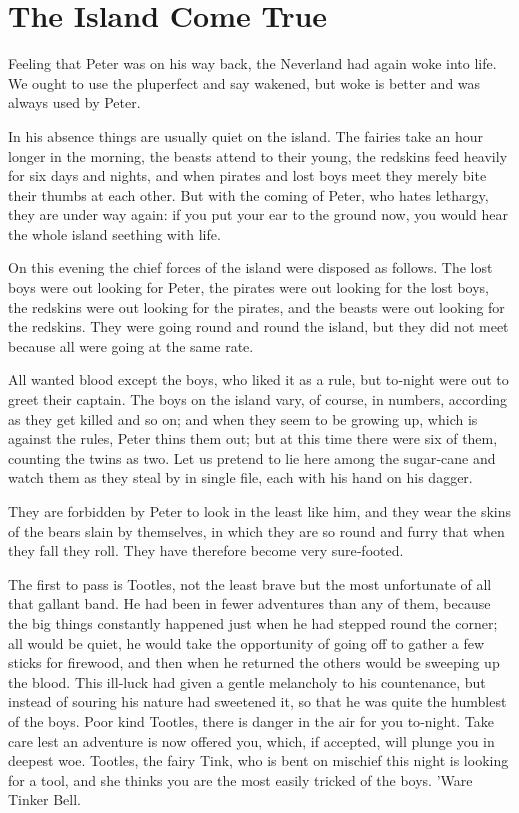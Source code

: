 
\chapter{The Island Come True}

Feeling that Peter was on his way back,
the Neverland had again woke into life.
We ought to use the pluperfect and say wakened,
but woke is better and was always used by Peter.

In his absence things are usually quiet on the island.
The fairies take an hour longer in the morning,
the beasts attend to their young,
the redskins feed heavily for six days and nights,
and when pirates and lost boys meet they merely bite their thumbs at each other.
But with the coming of Peter, who hates lethargy, they are under way again:
if you put your ear to the ground now, you would hear the whole island seething with life.

On this evening the chief forces of the island were disposed as follows.
The lost boys were out looking for Peter,
the pirates were out looking for the lost boys,
the redskins were out looking for the pirates,
and the beasts were out looking for the redskins.
They were going round and round the island,
but they did not meet because all were going at the same rate.

All wanted blood except the boys,
who liked it as a rule, but to‐night were out to greet their captain.
The boys on the island vary, of course, in numbers, according as they get killed and so on;
and when they seem to be growing up, which is against the rules, Peter thins them out;
but at this time there were six of them, counting the twins as two.
Let us pretend to lie here among the sugar‐cane and watch them as they steal by in single file,
each with his hand on his dagger.

They are forbidden by Peter to look in the least like him,
and they wear the skins of the bears slain by themselves,
in which they are so round and furry that when they fall they roll.
They have therefore become very sure‐footed.

The first to pass is Tootles,
not the least brave but the most unfortunate of all that gallant band.
He had been in fewer adventures than any of them,
because the big things constantly happened just when he had stepped round the corner;
all would be quiet, he would take the opportunity of going off to gather a few sticks for firewood,
and then when he returned the others would be sweeping up the blood.
This ill‐luck had given a gentle melancholy to his countenance,
but instead of souring his nature had sweetened it,
so that he was quite the humblest of the boys.
Poor kind Tootles, there is danger in the air for you to‐night.
Take care lest an adventure is now offered you, which, if accepted, will plunge you in deepest woe.
Tootles, the fairy Tink, who is bent on mischief this night is looking for a tool,
and she thinks you are the most easily tricked of the boys.
’Ware Tinker Bell.

